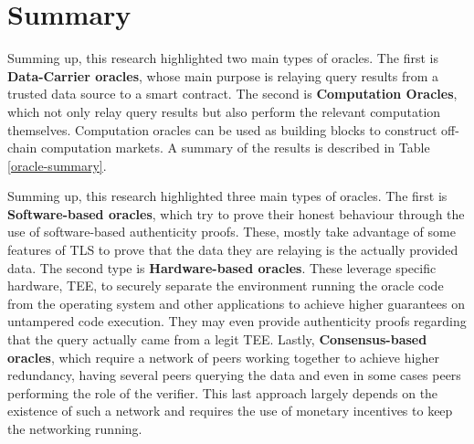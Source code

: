 \section{Summary}


Summing up, this research highlighted two main types of oracles. The first is \textbf{Data-Carrier oracles}, whose main purpose is relaying query results from a trusted data source to a smart contract. The second is \textbf{Computation Oracles}, which not only relay query results but also perform the relevant computation themselves. Computation oracles can be used as building blocks to construct off-chain computation markets. A summary of the results is described in Table \ref{oracle-summary}.




Summing up, this research highlighted three main types of oracles. The first is \textbf{Software-based oracles}, which try to prove their honest behaviour through the use of software-based authenticity proofs. These, mostly take advantage of some features of TLS to prove that the data they are relaying is the actually provided data. The second type is \textbf{Hardware-based oracles}. These leverage specific hardware, TEE, to securely separate the environment running the oracle code from the operating system and other applications to achieve higher guarantees on untampered code execution. They may even provide authenticity proofs regarding that the query actually came from a legit TEE. Lastly, \textbf{Consensus-based oracles}, which require a network of peers working together to achieve higher redundancy, having several peers querying the data and even in some cases peers performing the role of the verifier. This last approach largely depends on the existence of such a network and requires the use of monetary incentives to keep the networking running.

